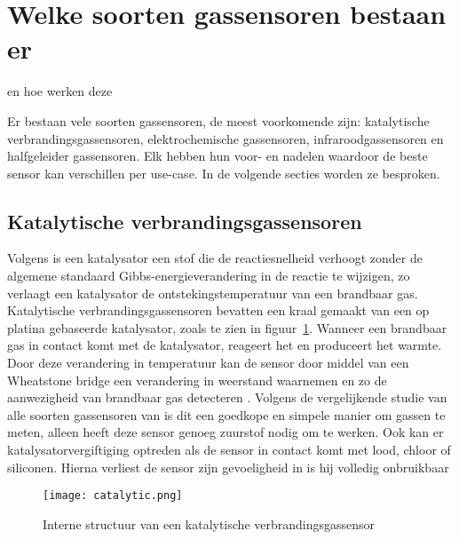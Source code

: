 \section{Welke soorten gassensoren bestaan er}%
\label{sec:soorten-gassensoren}
en hoe werken deze

Er bestaan vele soorten gassensoren, de meest voorkomende zijn: katalytische verbrandingsgassensoren, elektrochemische gassensoren, infraroodgassensoren en halfgeleider gassensoren. Elk hebben hun voor- en nadelen waardoor de beste sensor kan verschillen per use-case. In de volgende secties worden ze besproken.

\subsection{Katalytische verbrandingsgassensoren}
\label{subsec:katalytische}

Volgens 
is een katalysator een stof die de reactiesnelheid verhoogt zonder de algemene standaard Gibbs-energieverandering in de reactie te wijzigen, zo verlaagt een katalysator de ontstekingstemperatuur van een brandbaar gas. Katalytische verbrandingsgassensoren bevatten een kraal gemaakt van een op platina gebaseerde katalysator, zoals te zien in figuur~\ref{fig:catalytic}. Wanneer een brandbaar gas in contact komt met de katalysator, reageert het en produceert het warmte. Door deze verandering in temperatuur kan de sensor door middel van een Wheatstone bridge een verandering in weerstand waarnemen en zo de aanwezigheid van brandbaar gas detecteren
. Volgens de vergelijkende studie van alle soorten gassensoren van
is dit een goedkope en simpele manier om gassen te meten, alleen heeft deze sensor genoeg zuurstof nodig om te werken. Ook kan er katalysatorvergiftiging optreden als de sensor in contact komt met lood, chloor of siliconen. Hierna verliest de sensor zijn gevoeligheid in is hij volledig onbruikbaar

\begin{figure}[h]
    \texttt{[image: catalytic.png]}
    \caption[Structuur katalytische gassensor]{Interne structuur van een katalytische verbrandingsgassensor
    }
    \label{fig:catalytic}
\end{figure}


